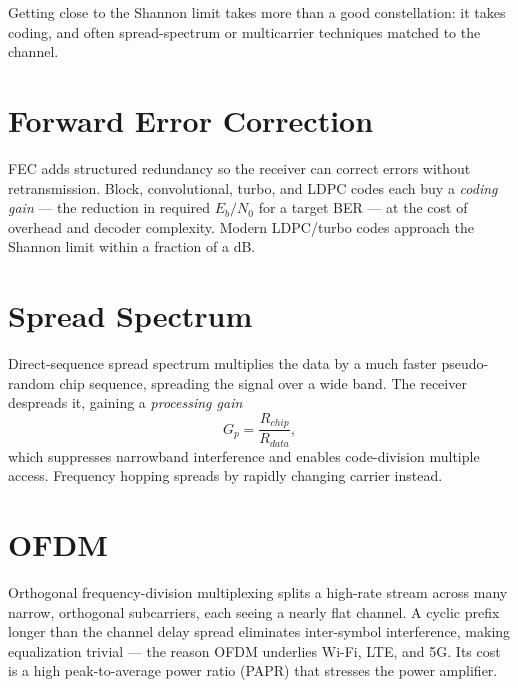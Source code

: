Getting close to the Shannon limit takes more than a good constellation: it takes
coding, and often spread-spectrum or multicarrier techniques matched to the
channel.

\section{Forward Error Correction}
FEC adds structured redundancy so the receiver can correct errors without
retransmission. Block, convolutional, turbo, and LDPC codes each buy a
\emph{coding gain} --- the reduction in required $E_b/N_0$ for a target BER ---
at the cost of overhead and decoder complexity. Modern LDPC/turbo codes approach
the Shannon limit within a fraction of a dB.

\section{Spread Spectrum}
Direct-sequence spread spectrum multiplies the data by a much faster pseudo-random
chip sequence, spreading the signal over a wide band. The receiver despreads it,
gaining a \emph{processing gain}
\[ G_p = \frac{R_{chip}}{R_{data}}, \]
which suppresses narrowband interference and enables code-division multiple
access. Frequency hopping spreads by rapidly changing carrier instead.

\section{OFDM}
Orthogonal frequency-division multiplexing splits a high-rate stream across many
narrow, orthogonal subcarriers, each seeing a nearly flat channel. A cyclic
prefix longer than the channel delay spread eliminates inter-symbol interference,
making equalization trivial --- the reason OFDM underlies Wi-Fi, LTE, and 5G. Its
cost is a high peak-to-average power ratio (PAPR) that stresses the power
amplifier.
